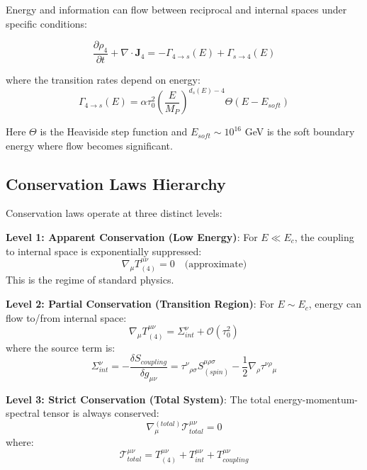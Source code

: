 Energy and information can flow between reciprocal and internal spaces under specific conditions:

\begin{equation}
    \frac{\partial \rho_4}{\partial t} + \nabla \cdot \mathbf{J}_4 = -\Gamma_{4 \to s}(E) + \Gamma_{s \to 4}(E)
\end{equation}

where the transition rates depend on energy:
\begin{equation}
    \Gamma_{4 \to s}(E) = \alpha \tau_0^2 \left(\frac{E}{M_P}\right)^{d_s(E) - 4} \Theta(E - E_{soft})
\end{equation}

Here $\Theta$ is the Heaviside step function and $E_{soft} \sim 10^{16}$ GeV is the soft boundary energy where flow becomes significant.

\subsection{Conservation Laws Hierarchy}

Conservation laws operate at three distinct levels:

\textbf{Level 1: Apparent Conservation (Low Energy)}:
For $E \ll E_c$, the coupling to internal space is exponentially suppressed:
\begin{equation}
    \nabla_\mu T^{\mu\nu}_{(4)} = 0 \quad \text{(approximate)}
\end{equation}
This is the regime of standard physics.

\textbf{Level 2: Partial Conservation (Transition Region)}:
For $E \sim E_c$, energy can flow to/from internal space:
\begin{equation}
    \nabla_\mu T^{\mu\nu}_{(4)} = \Sigma^\nu_{int} + \mathcal{O}(\tau_0^2)
\end{equation}
where the source term is:
\begin{equation}
    \Sigma^\nu_{int} = -\frac{\delta S_{coupling}}{\delta g_{\mu\nu}} = \tau^\nu{}_{\rho\sigma} S^{\mu\rho\sigma}_{(spin)} - \frac{1}{2}\nabla_\rho \tau^{\nu\rho}{}_\mu
\end{equation}

\textbf{Level 3: Strict Conservation (Total System)}:
The total energy-momentum-spectral tensor is always conserved:
\begin{equation}
    \nabla^{(total)}_\mu \mathcal{T}^{\mu\nu}_{total} = 0
\end{equation}
where:
\begin{equation}
    \mathcal{T}^{\mu\nu}_{total} = T^{\mu\nu}_{(4)} + T^{\mu\nu}_{int} + T^{\mu\nu}_{coupling}
\end{equation}

